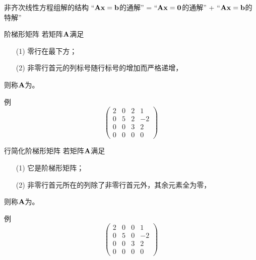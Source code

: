 \begin{frame}
  \begin{footnotesize}
    \begin{block}{非齐次线性方程组解的结构}
      “$\mathbf{A}\mathbf{x}=\mathbf{b}$的通解” =  “$\mathbf{A}\mathbf{x}=\mathbf{0}$的通解” + “$\mathbf{A}\mathbf{x}=\mathbf{b}$的特解”
    \end{block}
  \end{footnotesize}
\end{frame}



\begin{frame}
  \begin{footnotesize}
    \begin{block}{阶梯形矩阵}
      若矩阵$\mathbf{A}$满足
      \begin{itemize}
      \item[(1)] 零行在最下方；
      \item[(2)] 非零行首元的列标号随行标号的增加而严格递增，
      \end{itemize}
      则称$\mathbf{A}$为。
    \end{block}
    \pause
    \begin{exampleblock}{例}
      $$
      \left(
      \begin{array}{rrrr}
        2&0&2&1\\
        0&5&2&-2\\
        0&0&3&2\\
        0&0&0&0
      \end{array}
      \right)
      $$
    \end{exampleblock}
  \end{footnotesize}
\end{frame}


\begin{frame}
  \begin{footnotesize}
    \begin{block}{行简化阶梯形矩阵}
      若矩阵$\mathbf{A}$满足
      \begin{itemize}
      \item[(1)] 它是阶梯形矩阵；
      \item[(2)] 非零行首元所在的列除了非零行首元外，其余元素全为零，
      \end{itemize}
      则称$\mathbf{A}$为。
    \end{block}
    \pause
    \begin{exampleblock}{例}
      $$
      \left(
      \begin{array}{rrrr}
        2&0&0&1\\
        0&5&0&-2\\
        0&0&3&2\\
        0&0&0&0
      \end{array}
      \right)
      $$
    \end{exampleblock}
  \end{footnotesize}
\end{frame}

